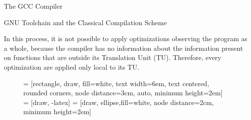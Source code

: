 \begin{section}{The GCC Compiler}
\begin{subsection}{GNU Toolchain and the Classical Compilation Scheme}

In this process, it is not possible to apply optimizations observing the program
as a whole, because the compiler has no information about the information present
on functions that are outside its Translation Unit (TU). Therefore, every
optimization are applied only local to its TU.


\begin{figure}
 = [rectangle, draw, fill=white,
    text width=6em, text centered, rounded corners, node distance=3cm, auto, minimum height=2em]
 = [draw, -latex]
 = [draw, ellipse,fill=white, node distance=2cm,
    minimum height=2em]
\begin{center}
\end{center}
\end{figure}
\end{subsection}
\end{section}

